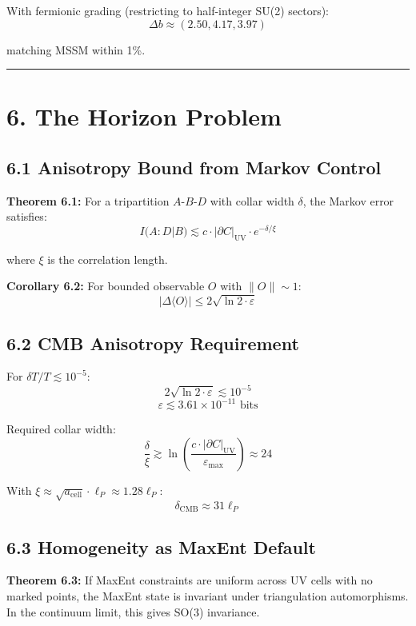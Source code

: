 With fermionic grading (restricting to half-integer SU(2) sectors): \[\Delta b \approx (2.50, 4.17, 3.97)\]

matching MSSM within 1\%.

\begin{center}\rule{0.5\linewidth}{0.5pt}\end{center}

\section{6. The Horizon Problem}\label{6-the-horizon-problem}

\subsection{6.1 Anisotropy Bound from Markov Control}\label{61-anisotropy-bound-from-markov-control}

\textbf{Theorem 6.1:} For a tripartition \(A\)-\(B\)-\(D\) with collar width \(\delta\), the Markov error satisfies: \[I(A:D|B) \lesssim c \cdot |\partial C|_{\text{UV}} \cdot e^{-\delta/\xi}\]

where \(\xi\) is the correlation length.

\textbf{Corollary 6.2:} For bounded observable \(O\) with \(\|O\| \sim 1\): \[|\Delta\langle O \rangle| \leq 2\sqrt{\ln 2 \cdot \varepsilon}\]

\subsection{6.2 CMB Anisotropy Requirement}\label{62-cmb-anisotropy-requirement}

For \(\delta T/T \lesssim 10^{-5}\): \[2\sqrt{\ln 2 \cdot \varepsilon} \lesssim 10^{-5}\] \[\varepsilon \lesssim 3.61 \times 10^{-11} \text{ bits}\]

Required collar width: \[\frac{\delta}{\xi} \gtrsim \ln\left(\frac{c \cdot |\partial C|_{\text{UV}}}{\varepsilon_{\text{max}}}\right) \approx 24\]

With \(\xi \approx \sqrt{a_{\text{cell}}} \cdot \ell_P \approx 1.28 \ell_P\): \[\delta_{\text{CMB}} \approx 31 \ell_P\]

\subsection{6.3 Homogeneity as MaxEnt Default}\label{63-homogeneity-as-maxent-default}

\textbf{Theorem 6.3:} If MaxEnt constraints are uniform across UV cells with no marked points, the MaxEnt state is invariant under triangulation automorphisms. In the continuum limit, this gives SO(3) invariance.

